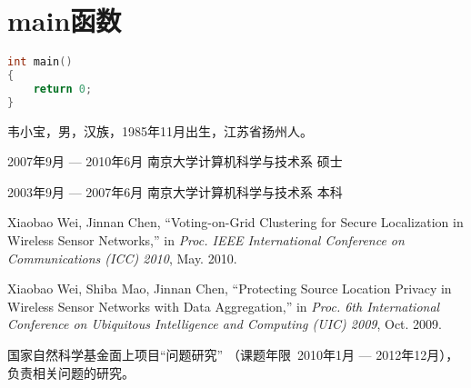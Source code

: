\documentclass[winfonts,master,twoside,AutoFakeBold= {2}]{njuthesis}
\begin{document}
\section{main函数}
\begin{lstlisting}[language=C]
int main()
{
	return 0;
}
\end{lstlisting}


\begin{acknowledgement}
    \lipsum[1]

\end{acknowledgement}


\backmatter
\begin{resume}
\begin{authorinfo}
\noindent 韦小宝，男，汉族，1985年11月出生，江苏省扬州人。
\end{authorinfo}
\begin{education}
\item[2007年9月 --- 2010年6月] 南京大学计算机科学与技术系 \hfill 硕士
\item[2003年9月 --- 2007年6月] 南京大学计算机科学与技术系 \hfill 本科
\end{education}
\begin{publications}
\item Xiaobao Wei, Jinnan Chen, ``Voting-on-Grid Clustering for Secure
  Localization in Wireless Sensor Networks,'' in \textsl{Proc. IEEE International
    Conference on Communications (ICC) 2010}, May. 2010.
\item Xiaobao Wei, Shiba Mao, Jinnan Chen, ``Protecting Source Location Privacy
  in Wireless Sensor Networks with Data Aggregation,'' in \textsl{Proc. 6th
    International Conference on Ubiquitous Intelligence and Computing (UIC)
    2009}, Oct. 2009.
\end{publications}
\begin{projects}
\item 国家自然科学基金面上项目``问题研究''
（课题年限~2010年1月 --- 2012年12月），负责相关问题的研究。
\end{projects}
\end{resume}

\statement

\makelicense

\end{document}
